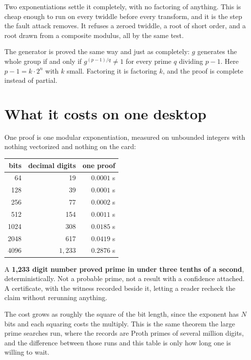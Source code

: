 Two exponentiations settle it completely, with no factoring of anything. This is cheap enough to run on every twiddle before every transform, and it is the step the fault attack removes. It refuses a zeroed twiddle, a root of short order, and a root drawn from a composite modulus, all by the same test.

The generator is proved the same way and just as completely: \(g\) generates the whole group if and only if \(g^{(p-1)/q} \ne 1\) for every prime \(q\) dividing \(p-1\). Here \(p - 1 = k \cdot 2^n\) with \(k\) small. Factoring it is factoring \(k\), and the proof is complete instead of partial.

\section{What it costs on one desktop}

One proof is one modular exponentiation, measured on unbounded integers with nothing vectorized and nothing on the card:

\begin{center}
\begin{tabular}{@{}rrr@{}}
\toprule
bits & decimal digits & one proof \\
\midrule
64 & 19 & \(0.0001\) s \\
128 & 39 & \(0.0001\) s \\
256 & 77 & \(0.0002\) s \\
512 & 154 & \(0.0011\) s \\
1024 & 308 & \(0.0185\) s \\
2048 & 617 & \(0.0419\) s \\
4096 & \(1{,}233\) & \(0.2876\) s \\
\bottomrule
\end{tabular}
\end{center}

A \textbf{1,233 digit number proved prime in under three tenths of a second}, deterministically. Not a probable prime, not a result with a confidence attached. A certificate, with the witness recorded beside it, letting a reader recheck the claim without rerunning anything.

The cost grows as roughly the square of the bit length, since the exponent has \(N\) bits and each squaring costs the multiply. This is the same theorem the large prime searches run, where the records are Proth primes of several million digits, and the difference between those runs and this table is only how long one is willing to wait.

